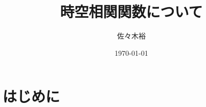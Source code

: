 \documentclass[12pt, dvipdfmx]{beamer}
\title
[時空相関関数]
{時空相関関数について}
\author{佐々木裕}
\institute{東亞合成}
\date{\today}
\begin{document}
\begin{frame}\frametitle{}
	\titlepage
\end{frame}

\section{はじめに}






\end{document}
